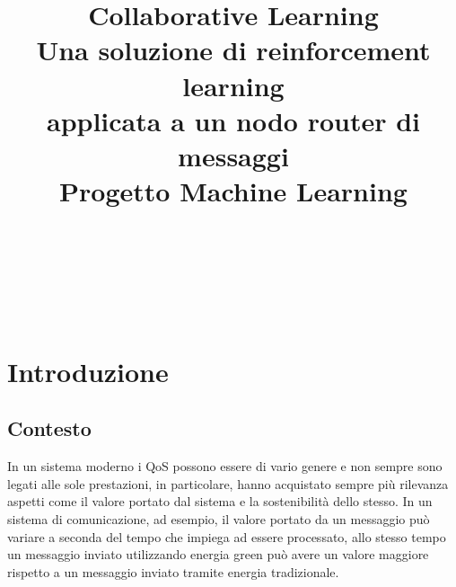 \documentclass[conference]{IEEEtran}
\begin{document}
\let\subsectionautorefname\sectionautorefname
\let\subsubsectionautorefname\sectionautorefname
\title{Collaborative Learning\\ \large Una soluzione di reinforcement learning\\ applicata a un nodo router di messaggi\\
{\footnotesize Progetto Machine Learning}
}
\author{
 \\
\and
{}
 \\
\and
{}
 \\
}

\maketitle
\thispagestyle{plain}
\pagestyle{plain}

\begin{abstract}
\end{abstract}

\section{Introduzione}

\subsection{Contesto}
In un sistema moderno i QoS possono essere di vario genere e non sempre sono legati alle sole prestazioni, in particolare, hanno acquistato sempre più rilevanza aspetti come il valore portato dal sistema e la sostenibilità dello stesso. In un sistema di comunicazione, ad esempio, il valore portato da un messaggio può variare a seconda del tempo che impiega ad essere processato, allo stesso tempo un messaggio inviato utilizzando energia green può avere un valore maggiore rispetto a un messaggio inviato tramite energia tradizionale.
\end{document}
